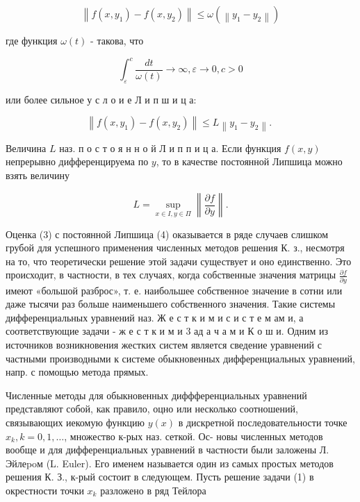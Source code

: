 \documentclass[10pt]{article}
\begin{document}
\[

\left\|f\left(x, y_{1}\right)-f\left(x, y_{2}\right)\right\| \leqslant \omega\left(\left\|y_{1}-y_{2}\right\|\right)

\]



где функция $\omega(t)$ - такова, что



\[

\int_{\varepsilon}^{c} \frac{d t}{\omega(t)} \longrightarrow \infty, \varepsilon \rightarrow 0, c>0

\]



или более сильное у с л о и е Л и п ш и ц а:



\[

\left\|f\left(x, y_{1}\right)-f\left(x, y_{2}\right)\right\| \leqslant L\left\|y_{1}-y_{2}\right\| \text {. }

\]



Величина $L$ наз. п о с т о я н н о й Л и п п и ц а. Если функция $f(x, y)$ непрерывно дифференцируема по $y$, то в качестве постоянной Липшица можно взять величину



\[

L=\sup _{x \in I, y \in \Pi}\left\|\frac{\partial f}{\partial y}\right\| .

\]



Оценка (3) с постоянной Липшица (4) оказывается в ряде случаев слишком грубой для успешного применения численных методов решения К. з., несмотря на то, что теоретически решение этой задачи существует и оно единственно. Это происходит, в частности, в тех случаях, когда собственные значения матрицы $\frac{\partial f}{\partial y}$ имеют «большой разброс», т. е. наибольшее собственное значение в сотни или даже тысячи раз больше наименьшего собственного значения. Такие системы дифференциальных уравнений наз. Ж е с т к и м и с и с т е м ам и, а соответствующие задачи - ж е с т к и м и 3 ад а ч а м и К о ш и. Одним из источников возникновения жестких систем является сведение уравнений с частными производными к системе обыкновенных дифференциальных уравнений, напр. с помощью метода прямых.



Численные методы для обыкновенных диффференциальных уравнений представляют собой, как правило, оцно или несколько соотношений, связывающих иекомую функцию $y(x)$ в дискретной последовательности точке $x_{k}, k=0,1, \ldots$, множество к-рых наз. сеткой. Ос- новы численных методов вообще и для дифференциальных уравнений в частности были заложены Л. Эйлеpoм (L. Euler). Его именем называется один из самых простых методов решения К. З., к-рый состоит в следующем. Пусть решение задачи (1) в окрестности точки $x_{k}$ разложено в ряд Тейлора
\end{document}
